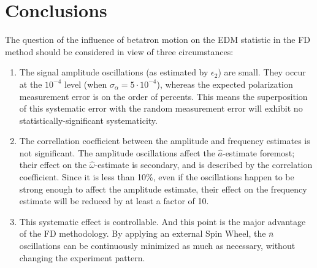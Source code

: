\documentclass[a4paper]{jacow}
\newcommand{\w}{\omega}
\newcommand{\nbar}{\bar n}
\begin{document}
\section{Conclusions}
The question of the influence of betatron motion on the EDM statistic in the FD method should be considered
in view of three circumstances:
\begin{enumerate}
\item The signal amplitude oscillations (as estimated by $\epsilon_2$) are small.
  They occur at the $10^{-4}$ level (when $\sigma_{\alpha}=5\cdot 10^{-4}$), whereas
  the expected polarization measurement error is on the order of percents.
  This means the superposition of this systematic error with the random measurement error
  will exhibit no statistically-significant systematicity.
\item The correllation coefficient between the amplitude and frequency estimates is not significant. The amplitude
  oscillations affect the $\hat a$-estimate foremost; their effect on the $\hat\w$-estimate is secondary, and is
  described by the correlation coefficient. Since it is less than 10\%, even if the oscillations happen to be
  strong enough to affect the amplitude estimate, their effect on the frequency estimate will be reduced by
  at least a factor of 10.
\item This systematic effect is controllable. And this point is the major advantage of the FD methodology.
  By applying an external Spin Wheel, the $\nbar$ oscillations can be continuously minimized
  as much as necessary, without changing the experiment pattern.
\end{enumerate}
\end{document}
